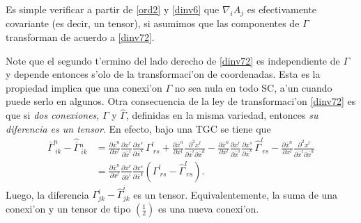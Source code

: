 Es simple verificar a partir de \eqref{ord2} y \eqref{dinv6} que $\nabla_iA_j$ es efectivamente covariante (es decir, un tensor), si asumimos que las componentes de $\Gamma$ transforman de acuerdo a \eqref{dinv72}.

Note que el segundo t'ermino del lado derecho de \eqref{dinv72} es independiente de $\Gamma$ y depende entonces s'olo de la transformaci'on de coordenadas. Esta es la propiedad implica que una conexi'on $\Gamma$ no sea nula en todo SC, a'un cuando puede serlo en algunos. Otra consecuencia de la ley de transformaci'on \eqref{dinv72} es que si \textit{dos conexiones}, $\Gamma$ y $\hat{\Gamma}$, definidas en la misma variedad, entonces \textit{su diferencia es un tensor}. En efecto, bajo una TGC se tiene que
\begin{align}
\bar\Gamma_{\ ik}^n-\hat{\overline{\Gamma}}{}^n_{\ ik} & =\frac{\partial
\bar{x}^n}{\partial x^l }\frac{\partial x^r}{\partial\bar{x}^i }
\frac{\partial x^s}{\partial\bar{x}^k }\,\Gamma_{\ rs}^l +\frac{\partial
\bar{x}^n}{\partial x^l }\frac{\partial^2 x^l }{\partial\bar{x}^i \partial\bar{x}^k }-\frac{\partial\bar{x}^n}{\partial x^l }
\frac{\partial x^r}{\partial\bar{x}^i }\frac{\partial x^s}{\partial
\bar{x}^k }\,\hat{\Gamma}_{\ rs}^l -\frac{\partial\bar{x}^n}{\partial x^l}\frac{\partial^2 x^l }{\partial\bar{x}^i \partial\bar{x}^k}\label{dinv8}\\
& =\frac{\partial
\bar{x}^n}{\partial x^l }\frac{\partial x^r}{\partial\bar{x}^i }
\frac{\partial x^s}{\partial\bar{x}^k }\left( \Gamma_{\ rs}^l
-\hat{\Gamma}_{\ rs}^l \right) .\nonumber
\end{align}
Luego, la diferencia $\Gamma_{jk}^i -\hat{\Gamma}_{jk}^i $ es un tensor. Equivalentemente, la suma de una conexi'on y un tensor de tipo $(_2^1)$ es una nueva conexi'on.

